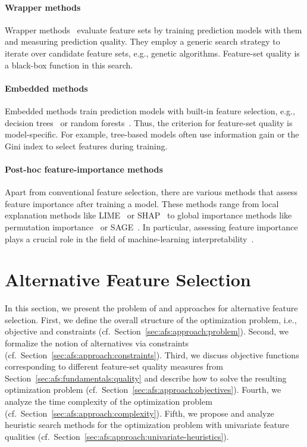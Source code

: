 \documentclass{article}
\theoremstyle{definition}
\begin{document}
\paragraph{Wrapper methods}

Wrapper methods~\cite{kohavi1997wrappers} evaluate feature sets by training prediction models with them and measuring prediction quality.
They employ a generic search strategy to iterate over candidate feature sets, e.g., genetic algorithms.
Feature-set quality is a black-box function in this search.

\paragraph{Embedded methods}

Embedded methods train prediction models with built-in feature selection, e.g., decision trees~\cite{breiman1984classification} or random forests~\cite{breiman2001random}.
Thus, the criterion for feature-set quality is model-specific.
For example, tree-based models often use information gain or the Gini index to select features during training.

\paragraph{Post-hoc feature-importance methods}

Apart from conventional feature selection, there are various methods that assess feature importance after training a model.
These methods range from local explanation methods like LIME~\cite{ribeiro2016should} or SHAP~\cite{lundberg2017unified} to global importance methods like permutation importance~\cite{breiman2001random} or SAGE~\cite{covert2020understanding}.
In particular, assessing feature importance plays a crucial role in the field of machine-learning interpretability~\cite{carvalho2019machine, molnar2020interpretable}.

\section{Alternative Feature Selection}
\label{sec:afs:approach}

In this section, we present the problem of and approaches for alternative feature selection.
First, we define the overall structure of the optimization problem, i.e., objective and constraints (cf.~Section~\ref{sec:afs:approach:problem}).
Second, we formalize the notion of alternatives via constraints (cf.~Section~\ref{sec:afs:approach:constraints}).
Third, we discuss objective functions corresponding to different feature-set quality measures from Section~\ref{sec:afs:fundamentals:quality} and describe how to solve the resulting optimization problem (cf.~Section~\ref{sec:afs:approach:objectives}).
Fourth, we analyze the time complexity of the optimization problem (cf.~Section~\ref{sec:afs:approach:complexity}).
Fifth, we propose and analyze heuristic search methods for the optimization problem with univariate feature qualities (cf.~Section~\ref{sec:afs:approach:univariate-heuristics}).
\end{document}
